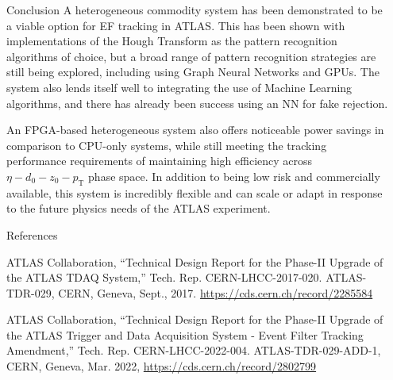 \documentclass[final]{beamer}
\newlength{\sepwidth}
\newlength{\colwidth}
\newcommand{\separatorcolumn}{\begin{column}{\sepwidth}\end{column}}
\begin{document}
\begin{frame}[t]
\begin{columns}[t]
\begin{column}{\colwidth}
\begin{exampleblock}{Conclusion}
    A heterogeneous commodity system has been demonstrated to be a viable option for EF tracking in ATLAS.
    This has been shown with implementations of the Hough Transform as the pattern recognition algorithms of choice, but 
    a broad range of pattern recognition strategies are still being explored, including using Graph Neural Networks and GPUs.
    The system also lends itself well to integrating the use of Machine Learning algorithms, and there has already been 
    success using an NN for fake rejection.

    An FPGA-based heterogeneous system also offers noticeable power savings in comparison to CPU-only systems, while still meeting 
    the tracking performance requirements of maintaining high efficiency across $\eta - d_0 - z_0 - p_\text{T}$ phase space. In addition to being
    low risk and commercially available, this system is incredibly flexible and can scale or adapt in response to the future physics needs of 
    the ATLAS experiment.

  \end{exampleblock}


  \begin{block}{References}
    \footnotesize{
      \begin{thebibliography}{1}

        ATLAS Collaboration, ``{Technical Design Report for the Phase-II Upgrade of the ATLAS
        TDAQ System},'' Tech. Rep. CERN-LHCC-2017-020. ATLAS-TDR-029, CERN, Geneva,
          Sept., 2017. \href{https://cds.cern.ch/record/2285584}{https://cds.cern.ch/record/2285584}
        
        ATLAS Collaboration, ``{Technical Design Report for the Phase-II Upgrade of the ATLAS Trigger
         and Data Acquisition System - Event Filter Tracking Amendment},'' Tech. Rep. CERN-LHCC-2022-004. 
         ATLAS-TDR-029-ADD-1, CERN, Geneva, Mar. 2022, \href{https://cds.cern.ch/record/2802799}{https://cds.cern.ch/record/2802799
        }
        
        \end{thebibliography}
    }
  \end{block}

\end{column}

\separatorcolumn
\end{columns}
\end{frame}
\end{document}
